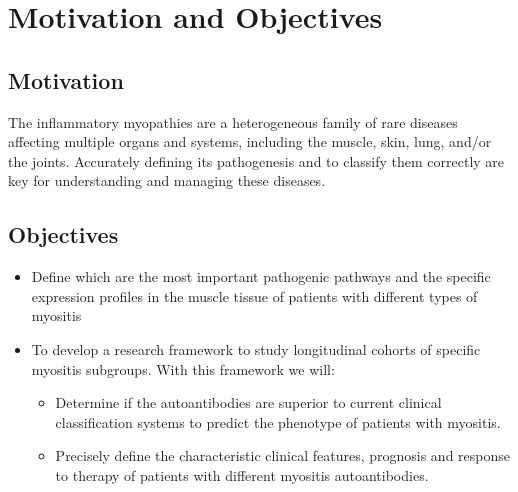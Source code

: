 \chapter{Motivation and Objectives}

\section{Motivation}
The inflammatory myopathies are a heterogeneous family of rare diseases affecting multiple organs and systems, including the muscle, skin, lung, and/or the joints.  Accurately defining its pathogenesis and to classify them correctly are key for understanding and managing these diseases.

\section{Objectives}
\begin{itemize}
	\item Define which are the most important pathogenic pathways and the specific expression profiles in the muscle tissue of patients with different types of myositis
	\item To develop a research framework to study longitudinal cohorts of specific myositis subgroups. With this framework we will:
	\begin{itemize}
		\item Determine if the autoantibodies are superior to current clinical classification systems to predict the phenotype of patients with myositis.
		\item Precisely define the characteristic clinical features, prognosis and response to therapy of patients with different myositis autoantibodies.
	\end{itemize}
\end{itemize}

